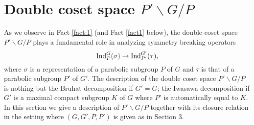 \documentclass[reqno,12pt]{pja00} %
\newcommand{\Ind}{\mbox{\normalfont Ind}}
\theoremstyle{definition}
\theoremstyle{exampstyle} \newtheorem{examp}[theorem]{Theorem}
\begin{document}
\section{Double coset space $P'\backslash G/P$}
As we observe in Fact \ref{fact:1} (and Fact \ref{fact1} below), the double coset space $P'\backslash G/P$ plays a fundamental role in analyzing symmetry breaking operators\begin{equation*}
	\Ind_P^G(\sigma)\to\Ind_{P'}^{G'}(\tau),
\end{equation*}where $\sigma$ is a representation of a parabolic subgroup $P$ of $G$ and $\tau$ is that of a parabolic subgroup $P'$ of $G'$. The description of the double coset space $P'\backslash G/P$
is nothing but the Bruhat decomposition if $G'=G$; the Iwasawa decomposition if $G'$ is a maximal compact subgroup $K$ of $G$ where $P'$ is automatically equal to $K$. In this section we give a description
of $P'\backslash G/P$ together with its closure relation in the setting where $(G,G',P,P')$ is given {as} in Section 3.
\end{document}
